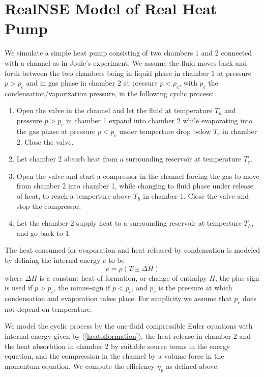 \section{RealNSE Model of Real Heat Pump}

We simulate a simple heat pump consisting of two chambers 1  and 2
connected with a channel as in Joule's experiment. We assume the fluid 
moves back and forth between the two chambers being
in liquid phase in chamber 1 at pressure $p>p_c$ and in
gas phase in chamber 2 at pressure $p<p_c$, with $p_c$ the 
condensation/vaporization pressure, in the following cyclic process:


\begin{enumerate}
\item Open the valve in the channel and let the fluid at 
temperature $T_h$ and pressure $p>p_c$ in chamber 1 expand into
chamber 2 while evaporating into the gas phase at pressure
$p<p_c$ under temperture drop 
below $T_c$ in chamber 2. Close the valve.
\item Let chamber 2 absorb heat from a surrounding reservoir
at temperature $T_c$.
\item Open the valve and start a compressor in the channel
forcing the gas to move from chamber 2 into chamber 1, while
changing to fluid phase under release of heat, to reach 
a temperture above $T_h$ in chamber 1. Close the valve and stop the compressor.
\item Let the chamber 2 supply heat to a surrounding reservoir
at temperture $T_h$, and go back to 1.
\end{enumerate}
The heat consumed for evaporation and heat released by condensation
is modeled by defining the internal energy $e$ to be 
\begin{equation}\label{heatofformation}
e=\rho (T\pm \Delta H)
\end{equation}
where $\Delta H$ is a constant heat of formation, 
or change of enthalpy $H$, the plus-sign is
used if $p>p_c$, the minus-sign if $p<p_c$, and $p_c$ is the
pressure at which condensation and evaporation takes place.
For simplicity we assume that $p_c$ does not depend on temperature. 

We model the cyclic process by the one-fluid compressible Euler equations
with internal energy given by (\ref{heatofformation}), the heat
release in chamber 2 and the heat absorbtion in chamber 2 by 
suitable source terms in the energy equation, and the compression
in the channel by a volume force in the momentum equation.
We compute the efficiency $\eta_p$ as defined above.

